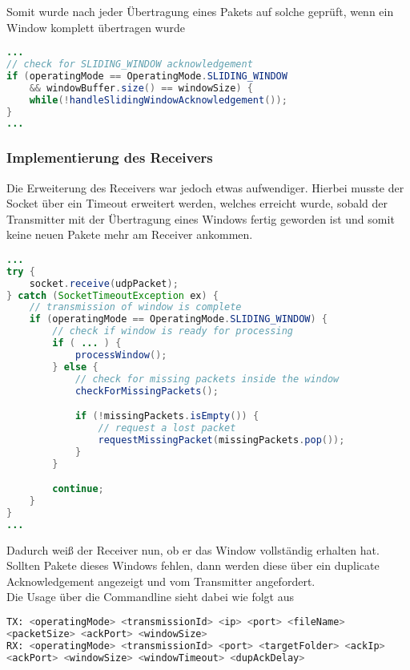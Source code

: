 \documentclass{article}
\begin{document}
    Somit wurde nach jeder Übertragung eines Pakets auf solche geprüft, wenn ein Window komplett übertragen wurde
    \begin{lstlisting}[language=Java]
...
// check for SLIDING_WINDOW acknowledgement
if (operatingMode == OperatingMode.SLIDING_WINDOW
    && windowBuffer.size() == windowSize) {
    while(!handleSlidingWindowAcknowledgement());
}
...
    \end{lstlisting}

    \subsubsection*{Implementierung des Receivers}
    Die Erweiterung des Receivers war jedoch etwas aufwendiger.
    Hierbei musste der Socket über ein Timeout erweitert werden, welches erreicht wurde, sobald der Transmitter
    mit der Übertragung eines Windows fertig geworden ist und somit keine neuen Pakete mehr am Receiver ankommen.

    \begin{lstlisting}[language=Java]
...
try {
    socket.receive(udpPacket);
} catch (SocketTimeoutException ex) {
    // transmission of window is complete
    if (operatingMode == OperatingMode.SLIDING_WINDOW) {
        // check if window is ready for processing
        if ( ... ) {
            processWindow();
        } else {
            // check for missing packets inside the window
            checkForMissingPackets();

            if (!missingPackets.isEmpty()) {
                // request a lost packet
                requestMissingPacket(missingPackets.pop());
            }
        }

        continue;
    }
}
...
    \end{lstlisting}

    Dadurch weiß der Receiver nun, ob er das Window vollständig erhalten hat.
    Sollten Pakete dieses Windows fehlen, dann werden diese über ein duplicate Acknowledgement angezeigt und
    vom Transmitter angefordert.\\

    Die Usage über die Commandline sieht dabei wie folgt aus
    \begin{lstlisting}[language=Bash]
TX: <operatingMode> <transmissionId> <ip> <port> <fileName>
<packetSize> <ackPort> <windowSize>
RX: <operatingMode> <transmissionId> <port> <targetFolder> <ackIp>
<ackPort> <windowSize> <windowTimeout> <dupAckDelay>
    \end{lstlisting}
\end{document}
